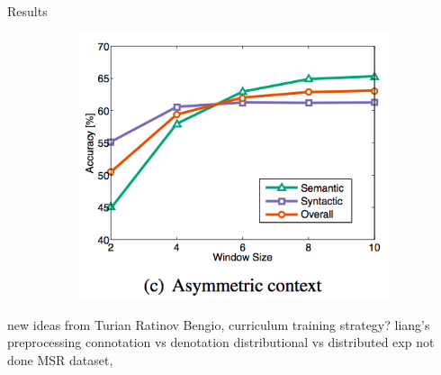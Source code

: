 \begin{frame}{Results}
\begin{figure}
\begin{subfigure}[b]{0.33\textwidth}
    \end{subfigure}%
    \begin{subfigure}[b]{0.33\textwidth}
      \includegraphics[width=\textwidth]{images/analogy3.png}
    \end{subfigure}%
  \end{figure}
\end{frame}


\begin{frame}
  new ideas from Turian Ratinov Bengio,
  curriculum training strategy?
  liang's preprocessing
  connotation vs denotation
  distributional vs distributed
  exp not done MSR dataset, 
\end{frame}
